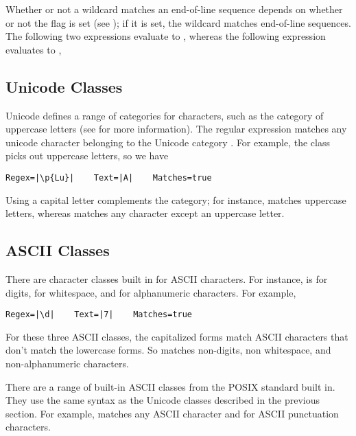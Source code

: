 Whether or not a wildcard matches an end-of-line sequence depends on
whether or not the  flag is set (see
); if it is set, the wildcard matches
end-of-line sequences.  The following two expressions evaluate to
,
%
%
whereas the following expression evaluates to ,
%

\subsection{Unicode Classes}\label{section:regex-unicode-classes}

Unicode defines a range of categories for characters, such as the
category  of uppercase letters (see
 for more information).  The regular
expression  matches any unicode character
belonging to the Unicode category .  For example,
the class  picks out uppercase letters, so we have
%
\begin{verbatim}
Regex=|\p{Lu}|    Text=|A|    Matches=true
\end{verbatim}
%

Using a capital letter complements the category; for instance,
 matches uppercase letters, whereas
 matches any character except an uppercase letter.

\subsection{ASCII Classes}

There are character classes built in for ASCII characters.  For
instance,  is for digits,  for whitespace,
and  for alphanumeric characters.  For example,
%
\begin{verbatim}
Regex=|\d|    Text=|7|    Matches=true
\end{verbatim}
%
For these three ASCII classes, the capitalized forms match
ASCII characters that don't match the lowercase forms.  So
 matches non-digits,  non whitespace,
and  non-alphanumeric characters.

There are a range of built-in ASCII classes from the POSIX standard
built in.  They use the same syntax as the Unicode classes described
in the previous section.  For example,  matches
any ASCII character and  for ASCII punctuation
characters.

